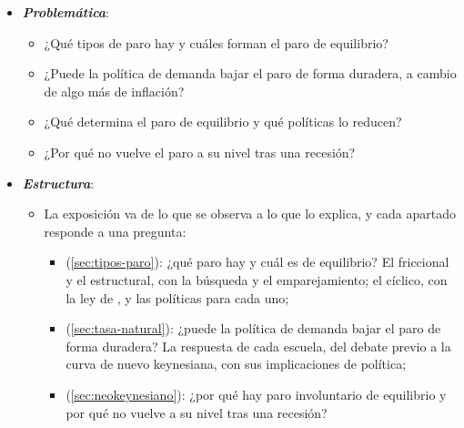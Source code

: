 \documentclass[11pt]{article}
\begin{document}
\begin{itemize}
\item \textbf{\emph{Problemática}}:
  \begin{itemize}
  \item ¿Qué tipos de paro hay y cuáles forman el paro de equilibrio?
  \item ¿Puede la política de demanda bajar el paro de forma duradera, a cambio de algo más de inflación?
  \item ¿Qué determina el paro de equilibrio y qué políticas lo reducen?
  \item ¿Por qué no vuelve el paro a su nivel tras una recesión?
  \end{itemize}

\item \textbf{\emph{Estructura}}:
  \begin{itemize}
  \item La exposición va de lo que se observa a lo que lo explica, y cada apartado responde a una pregunta:
  \begin{itemize}
  \item {} (\ref{sec:tipos-paro}): ¿qué paro hay y cuál es de equilibrio? El friccional y el estructural, con la búsqueda y el emparejamiento; el cíclico, con la ley de , y las políticas para cada uno;
  \item {} (\ref{sec:tasa-natural}): ¿puede la política de demanda bajar el paro de forma duradera? La respuesta de cada escuela, del debate previo a la curva de  nuevo keynesiana, con sus implicaciones de política;
  \item {} (\ref{sec:neokeynesiano}): ¿por qué hay paro involuntario de equilibrio y por qué no vuelve a su nivel tras una recesión?
  \end{itemize}
  \end{itemize}
\end{itemize}
\end{document}
